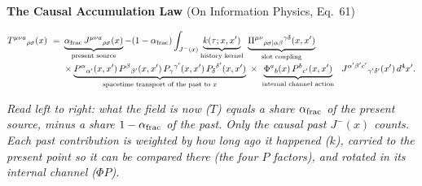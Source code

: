 \documentclass[9pt]{extarticle}
\newcommand{\say}[1]{{\color{note}\footnotesize\textit{#1}\par}}
\begin{document}
\vspace{-2pt}
{\color{ink}\textbf{The Causal Accumulation Law}} {\color{note}\small(On Information Physics, Eq.~61)}
{\footnotesize
\vspace{-3pt}
\[
\begin{aligned}
T^{\mu\nu a}{}_{\rho\sigma}(x)\ =\ &\underbrace{\alpha_{\rm frac}\,J^{\mu\nu a}{}_{\rho\sigma}(x)}_{\text{present source}}-(1-\alpha_{\rm frac})\int_{J^-(x)}\underbrace{k(\tau;x,x')}_{\text{history kernel}}\ \underbrace{\Pi^{\mu\nu}{}_{\rho\sigma|\alpha\beta}{}^{\gamma\delta}(x,x')}_{\text{slot coupling}}\\[-2pt]
&\times\underbrace{P^{\alpha}{}_{\alpha'}(x,x')\,P^{\beta}{}_{\beta'}(x,x')\,P_{\gamma}{}^{\gamma'}(x,x')\,P_{\delta}{}^{\delta'}(x,x')}_{\text{spacetime transport of the past to }x}\ \times\ \underbrace{\Phi^a{}_b(x)\,P^b{}_{c'}(x,x')}_{\text{internal channel action}}\ \ J^{\alpha'\beta'c'}{}_{\gamma'\delta'}(x')\,d^4x'.
\end{aligned}
\]\par\vspace{-5pt}}
\say{Read left to right: what the field is now ($T$) equals a share $\alpha_{\rm frac}$ of the present source, minus a share $1-\alpha_{\rm frac}$ of the past. Only the causal past $J^-(x)$ counts. Each past contribution is weighted by how long ago it happened ($k$), carried to the present point so it can be compared there (the four $P$ factors), and rotated in its internal channel ($\Phi P$).}
\end{document}
